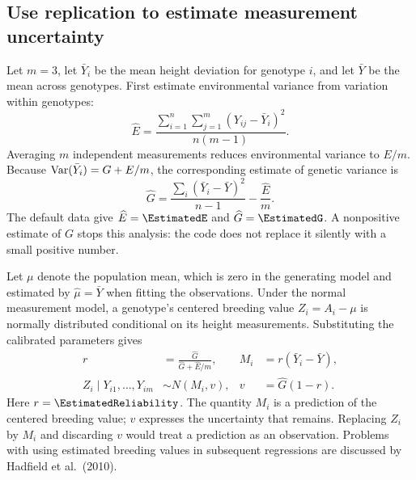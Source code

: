 \documentclass[11pt]{article}
\begin{document}
\subsection{Use replication to estimate measurement uncertainty}
Let $m=3$, let $\bar Y_i$ be the mean height deviation for genotype $i$, and let $\bar Y$ be the mean across genotypes. First estimate environmental variance from variation within genotypes:
\begin{equation}
 \widehat E=\frac{\sum_{i=1}^{n}\sum_{j=1}^{m}(Y_{ij}-\bar Y_i)^2}{n(m-1)}.
 \label{eq:Ehat}
\end{equation}
Averaging $m$ independent measurements reduces environmental variance to $E/m$. Because $\operatorname{Var}(\bar Y_i)=G+E/m$, the corresponding estimate of genetic variance is
\begin{equation}
 \widehat G=\frac{\sum_i(\bar Y_i-\bar Y)^2}{n-1}-\frac{\widehat E}{m}.
 \label{eq:Ghat}
\end{equation}
The default data give $\widehat E=\EstimatedE$ and $\widehat G=\EstimatedG$. A nonpositive estimate of $G$ stops this analysis: the code does not replace it silently with a small positive number.

Let $\mu$ denote the population mean, which is zero in the generating model and estimated by $\widehat\mu=\bar Y$ when fitting the observations. Under the normal measurement model, a genotype's centered breeding value $Z_i=A_i-\mu$ is normally distributed conditional on its height measurements. Substituting the calibrated parameters gives
\begin{align}
 r&=\frac{\widehat G}{\widehat G+\widehat E/m}, &
 M_i&=r(\bar Y_i-\bar Y),\label{eq:shrink}\\
 Z_i\mid Y_{i1},\ldots,Y_{im}&\sim N(M_i,v), &
 v&=\widehat G(1-r).\label{eq:posterior}
\end{align}
Here $r=\EstimatedReliability$. The quantity $M_i$ is a prediction of the centered breeding value; $v$ expresses the uncertainty that remains. Replacing $Z_i$ by $M_i$ and discarding $v$ would treat a prediction as an observation. Problems with using estimated breeding values in subsequent regressions are discussed by Hadfield et al.\ (2010).
\end{document}
